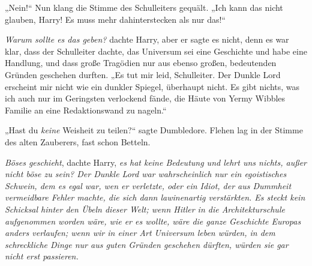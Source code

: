 „Nein!“ Nun klang die Stimme des Schulleiters gequält.
„Ich kann das nicht glauben, Harry! Es muss mehr dahinterstecken als nur das!“

\emph{Warum sollte es das geben?} dachte Harry, aber er sagte es nicht, denn es war klar, dass der Schulleiter dachte, das Universum sei eine Geschichte und habe eine Handlung, und dass große Tragödien nur aus ebenso großen, bedeutenden Gründen geschehen durften. „Es tut mir leid, Schulleiter. Der Dunkle Lord erscheint mir nicht wie ein dunkler Spiegel, überhaupt nicht. Es gibt nichts, was ich auch nur im Geringsten verlockend fände, die Häute von Yermy Wibbles Familie an eine Redaktionswand zu nageln.“

„Hast du \emph{keine} Weisheit zu teilen?“ sagte Dumbledore. Flehen lag in der Stimme des alten Zauberers, fast schon Betteln.

\emph{Böses geschieht}, dachte Harry, \emph{es hat keine Bedeutung und lehrt uns nichts, außer nicht böse zu sein? Der Dunkle Lord war wahrscheinlich nur ein egoistisches Schwein, dem es egal war, wen er verletzte, oder ein Idiot, der aus Dummheit vermeidbare Fehler machte, die sich dann lawinenartig verstärkten. Es steckt kein Schicksal hinter den Übeln dieser Welt; wenn Hitler in die Architekturschule aufgenommen worden wäre, wie er es wollte, wäre die ganze Geschichte Europas anders verlaufen; wenn wir in einer Art Universum leben würden, in dem schreckliche Dinge nur aus guten Gründen geschehen dürften, würden sie gar nicht erst passieren.}

